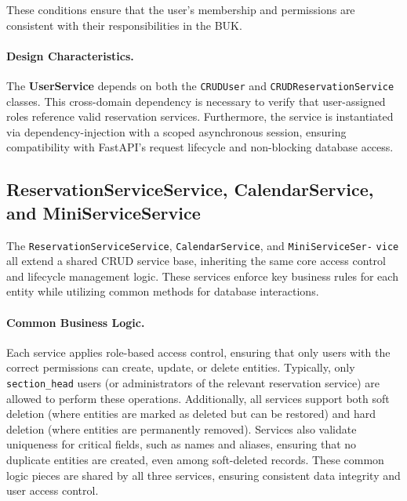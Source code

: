 These conditions ensure that the user’s membership and permissions are consistent with their responsibilities in the BUK.

\paragraph{Design Characteristics.}
The \textbf{UserService} depends on both the \texttt{CRUDUser} and \texttt{CRUDReservationService} classes. This cross-domain dependency is necessary to verify that user-assigned roles reference valid reservation services. Furthermore, the service is instantiated via dependency-injection with a scoped asynchronous session, ensuring compatibility with FastAPI’s request lifecycle and non-blocking database access.

\subsection{ReservationServiceService, CalendarService,\\ and MiniServiceService}

The \texttt{ReservationServiceService}, \texttt{CalendarService}, and \texttt{MiniServiceSer-} \texttt{vice} all extend a shared CRUD service base, inheriting the same core access control and lifecycle management logic. These services enforce key business rules for each entity while utilizing common methods for database interactions.

\paragraph{Common Business Logic.}  
Each service applies role-based access control, ensuring that only users with the correct permissions can create, update, or delete entities. Typically, only \texttt{section\_head} users (or administrators of the relevant reservation service) are allowed to perform these operations. Additionally, all services support both soft deletion (where entities are marked as deleted but can be restored) and hard deletion (where entities are permanently removed). Services also validate uniqueness for critical fields, such as names and aliases, ensuring that no duplicate entities are created, even among soft-deleted records. These common logic pieces are shared by all three services, ensuring consistent data integrity and user access control.

